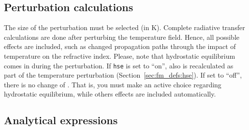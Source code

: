 \subsection{Perturbation calculations}
%
The size of the perturbation must be selected (in K).
Complete radiative transfer calculations are done after perturbing the
temperature field. Hence, all possible effects are included, such as changed
propagation paths through the impact of temperature on the refractive index.
Please, note that hydrostatic equilibrium comes in during the perturbation. If
\verb|hse| is set to ``on'', also  is recalculated as part
of the temperature perturbation (Section~\ref{sec:fm_defs:hse}). If set to
``off'', there is no change of . That is, you must make an
active choice regarding hydrostatic equilibrium, while others effects are
included automatically.


\subsection{Analytical expressions}
%
